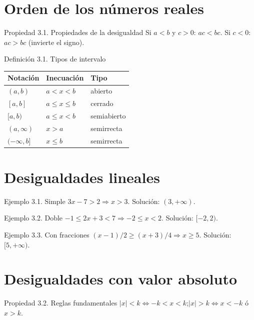 \documentclass[12pt,letterpaper]{book}
\begin{document}
\section{Orden de los números reales}

\begin{propbox}{Propiedad 3.1. Propiedades de la desigualdad}
Si $a<b$ y $c>0$: $ac<bc$. Si $c<0$: $ac>bc$ (invierte el signo).
\end{propbox}

\begin{defbox}{Definición 3.1. Tipos de intervalo}
\begin{center}
\begin{tabular}{lll}
\textbf{Notación} & \textbf{Inecuación} & \textbf{Tipo}\\\hline
$(a,b)$ & $a<x<b$ & abierto\\
$[a,b]$ & $a\leq x\leq b$ & cerrado\\
$[a,b)$ & $a\leq x<b$ & semiabierto\\
$(a,\infty)$ & $x>a$ & semirrecta\\
$(-\infty,b]$ & $x\leq b$ & semirrecta
\end{tabular}
\end{center}
\end{defbox}

\section{Desigualdades lineales}

\begin{ejbox}{Ejemplo 3.1. Simple}
$3x-7>2\Rightarrow x>3$. Solución: $(3,+\infty)$.
\end{ejbox}

\begin{ejbox}{Ejemplo 3.2. Doble}
$-1\leq2x+3<7\Rightarrow-2\leq x<2$. Solución: $[-2,2)$.
\end{ejbox}

\begin{ejbox}{Ejemplo 3.3. Con fracciones}
$(x-1)/2\geq(x+3)/4\Rightarrow x\geq5$. Solución: $[5,+\infty)$.
\end{ejbox}

\section{Desigualdades con valor absoluto}

\begin{propbox}{Propiedad 3.2. Reglas fundamentales}
$|x|<k\Leftrightarrow-k<x<k$;\qquad $|x|>k\Leftrightarrow x<-k$ ó $x>k$.
\end{propbox}
\end{document}
